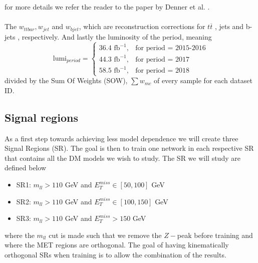 \documentclass[12pt, a4paper]{book}
\begin{document}
for more details we refer the reader to the paper by Denner et al. \cite{Denner:2022pwc}. \\
\\The $w_{ttbar}, w_{jet}$ and $w_{bjet}$, which are reconstruction corrections for $t\overline{t}$ \cite{Czakon:2015owf}, jets \cite{ATLAS:2014hvo} and b-jets \cite{ATLAS:2019bwq}, respectively. And lastly the luminosity of the period, meaning
$$
\text{lumi}_{period} = \begin{cases}
               36.4\text{ fb}^{-1},& \text{for period = 2015-2016}\\
               44.3\text{ fb}^{-1},& \text{for  period = 2017}\\
               58.5\text{ fb}^{-1},& \text{for  period = 2018}
               \end{cases}
$$
divided by the Sum Of Weights (SOW), $\sum w_{mc}$ of every sample for each dataset ID.

\subsection{Signal regions}\label{sec:SRs}
As a first step towards achieving less model dependence we will create three Signal Regions (SR). The goal is then to train one network in each respective SR that contains all the DM models we wish to study. The SR we will study are defined below 
\begin{itemize}
   \item SR1: $m_{ll} >110$ GeV and $E_T^{miss} \in [50, 100]$ GeV
   \item SR2: $m_{ll} >110$ GeV and $E_T^{miss} \in [100, 150]$ GeV
   \item SR3: $m_{ll} >110$ GeV and $E_T^{miss} >150$ GeV
\end{itemize}
where the $m_{ll}$ cut is made such that we remove the $Z-$peak before training and where the MET regions are orthogonal. 
The goal of having kinematically orthogonal SRs when training is to allow the combination of the results.
\end{document}
